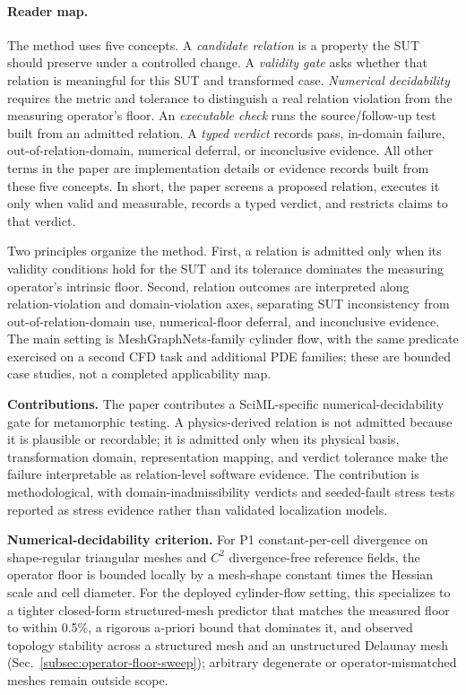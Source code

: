 \documentclass[preprint,12pt,authoryear]{elsarticle}
\begin{document}
\paragraph{Reader map.}
The method uses five concepts. A \emph{candidate relation} is a property the
SUT should preserve under a controlled change. A \emph{validity gate} asks
whether that relation is meaningful for this SUT and transformed case.
\emph{Numerical decidability} requires the metric and tolerance to distinguish
a real relation violation from the measuring operator's floor. An
\emph{executable check} runs the source/follow-up test built from an admitted
relation. A \emph{typed verdict} records pass, in-domain failure,
out-of-relation-domain, numerical deferral, or inconclusive evidence. All other terms in the paper are implementation details or evidence records built from these five concepts. In short, the paper screens a proposed relation, executes it only when valid and measurable, records a typed verdict, and restricts claims to that verdict.

Two principles organize the method. First, a relation is admitted only when its
validity conditions hold for the SUT and its tolerance dominates the measuring
operator's intrinsic floor. Second, relation outcomes are interpreted along
relation-violation and domain-violation axes, separating SUT inconsistency from
out-of-relation-domain use, numerical-floor deferral, and inconclusive evidence.
The main setting is MeshGraphNets-family cylinder flow, with the same predicate
exercised on a second CFD task and additional PDE families; these are bounded
case studies, not a completed applicability map.

\textbf{Contributions.} The paper contributes a SciML-specific
numerical-decidability gate for metamorphic testing. A physics-derived relation
is not admitted because it is plausible or recordable; it is admitted only when
its physical basis, transformation domain, representation mapping, and verdict
tolerance make the failure interpretable as relation-level software evidence.
The contribution is methodological, with domain-inadmissibility verdicts and
seeded-fault stress tests reported as stress evidence rather than validated
localization models.

\textbf{Numerical-decidability criterion.} For P1 constant-per-cell divergence on shape-regular triangular meshes and $C^2$ divergence-free reference fields, the operator floor is bounded locally by a mesh-shape constant times the Hessian scale and cell diameter. For the deployed cylinder-flow setting, this specializes to a tighter closed-form structured-mesh predictor that matches the measured floor to within 0.5\%, a rigorous a-priori bound that dominates it, and observed topology stability across a structured mesh and an unstructured Delaunay mesh (Sec.~\ref{subsec:operator-floor-sweep}); arbitrary degenerate or operator-mismatched meshes remain outside scope.
\end{document}
